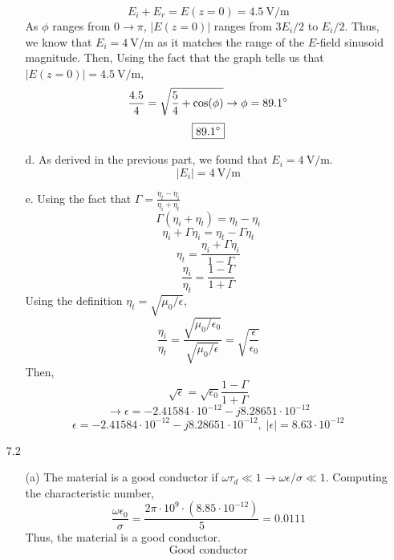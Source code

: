 \documentclass[12pt]{article}
\begin{document}
\begin{enumerate}
\begin{enumerate}
		\[E_i+E_r=E(z=0)=4.5 \: \mathrm{V/m}\]
		As $\phi$ ranges from $0\to \pi$, $|E(z=0)|$ ranges from $3E_i/2$ to $E_i/2$.
		Thus, we know that $E_i=4\:\mathrm{V/m}$ as it matches the range of the $E$-field sinusoid magnitude.
		Then,
		Using the fact that the graph tells us that $|E(z=0)|=4.5 \: \mathrm{V/m}$,
		\[\frac{4.5}{4}=\sqrt{\frac{5}{4}+\cos(\phi)}\to\phi =89.1\degree \]
		\[\boxed{89.1\degree}\]

		\item [d.]
		As derived in the previous part, we found that $E_i=4\:\mathrm{V/m}$.
		\[\boxed{|E_i|=4\:\mathrm{V/m}}\]
		
		\item [e.]
		Using the fact that $\Gamma=\frac{\eta_t-\eta_i}{\eta_i+\eta_t}$
		\[\Gamma(\eta_i+\eta_t)=\eta_t-\eta_i\]
		\[\eta_i + \Gamma \eta_i=\eta_t-\Gamma \eta_t\]
		\[\eta_t = \frac{\eta_i + \Gamma \eta_i}{1-\Gamma}\]
		\[\frac{\eta_i}{\eta_t}=\frac{1-\Gamma}{1+\Gamma}\]
		Using the definition $\eta_t = \sqrt{\mu_0/\epsilon}$,
		\[\frac{\eta_i}{\eta_t}=\frac{\sqrt{\mu_0/\epsilon_0}}{\sqrt{\mu_0/\epsilon}}=\sqrt{\frac{\epsilon}{\epsilon_0}}\]
		Then,
		\[\sqrt{\epsilon}=\sqrt{\epsilon_0}\frac{1-\Gamma}{1+\Gamma}\]
		\[\to \epsilon=-2.41584\cdot 10^{-12}-j8.28651\cdot 10^{-12}\]
		\[\boxed{\epsilon=-2.41584\cdot 10^{-12}-j8.28651\cdot 10^{-12}, \; |\epsilon| = 8.63\cdot 10^{-12}}\]

	\end{enumerate}

	\item [7.2]
	\begin{enumerate}
		\item[(a)]
		The material is a good conductor if $\omega\tau_d\ll 1 \to \omega \epsilon/\sigma \ll 1$.
		Computing the characteristic number,
		\[\frac{\omega \epsilon_0}{\sigma}=\frac{2\pi\cdot 10^9\cdot (8.85\cdot 10^{-12})}{5}=0.0111\]
		Thus, the material is a good conductor.
		\[\boxed{\text{Good conductor}}\]


\end{enumerate}
\end{enumerate}
\end{document}
